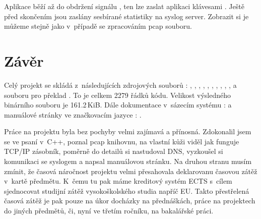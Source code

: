 \documentclass[11pt, a4paper, titlepage]{article}
\begin{document}
\begin{center}
\end{center}

\scriptsize






\normalsize

\medskip

Aplikace běží až do obdržení signálu , ten lze zaslat aplikaci klávesami . Ještě před skončením jsou zaslány sesbírané statistiky na syslog server. Zobrazit si je můžeme stejně jako v~případě se zpracováním pcap souboru.

\newpage


\section{Závěr}

Celý projekt se skládá z~následujících zdrojových souborů : , , , , , , , , , ,  a souboru pro překlad . To je celkem 2279 řádků kódu. Velikost výsledného binárního souboru  je 161.2\,KiB. Dále dokumentace v~sázecím systému :  a manuálové stránky ve značkovacím jazyce : .
\bigskip

Práce na projektu byla bez pochyby velmi zajímavá a přínosná. Zdokonalil jsem se ve psaní v~C++, poznal pcap knihovnu, na vlastní kůži viděl jak funguje TCP/IP zásobník, poměrně do detailů si nastudoval DNS, vyzkoušel si komunikaci se syslogem a napsal manuálovou stránku. Na druhou stranu musím zmínit, že časová náročnost projektu velmi přesahovala deklarovanu časovou zátěž v~kartě předmětu. K~čemu tu pak máme kreditový systém ECTS s~cílem sjednocovat studijní zátěž vysokoškolského studia napříč EU. Takto přestřelená časová zátěž je pak pouze na úkor docházky na přednáškách, práce na projektech do jiných předmětů, či, nyní ve třetím ročníku, na bakalářské práci.
\end{document}
